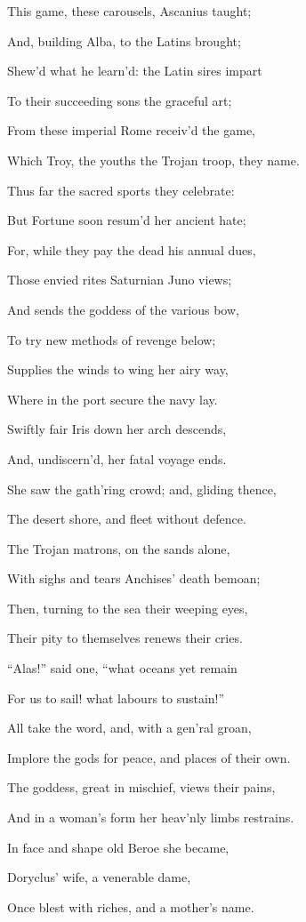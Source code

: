This game, these carousels, Ascanius taught;

And, building Alba, to the Latins brought;

Shew’d what he learn’d: the Latin sires impart

To their succeeding sons the graceful art;

From these imperial Rome receiv’d the game,

Which Troy, the youths the Trojan troop, they name.

Thus far the sacred sports they celebrate:

But Fortune soon resum’d her ancient hate;

For, while they pay the dead his annual dues,

Those envied rites Saturnian Juno views;

And sends the goddess of the various bow,

To try new methods of revenge below;

Supplies the winds to wing her airy way,

Where in the port secure the navy lay.

Swiftly fair Iris down her arch descends,

And, undiscern’d, her fatal voyage ends.

She saw the gath’ring crowd; and, gliding thence,

The desert shore, and fleet without defence.

The Trojan matrons, on the sands alone,

With sighs and tears Anchises’ death bemoan;

Then, turning to the sea their weeping eyes,

Their pity to themselves renews their cries.

“Alas!” said one, “what oceans yet remain

For us to sail! what labours to sustain!”

All take the word, and, with a gen’ral groan,

Implore the gods for peace, and places of their own.

The goddess, great in mischief, views their pains,

And in a woman’s form her heav’nly limbs restrains.

In face and shape old Beroe she became,

Doryclus’ wife, a venerable dame,

Once blest with riches, and a mother’s name.

